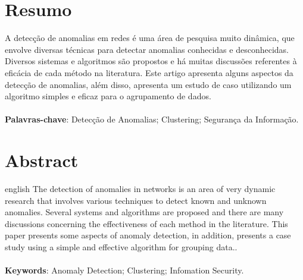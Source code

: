 \documentclass[article,12pt,oneside,a4paper,english,brazil]{unifil}
\date{}
\begin{document}
\frenchspacing
\maketitle
\normalsize

\fontsize{10}{1}\selectfont
\section*{Resumo}
A detecção de anomalias em redes é uma área de pesquisa muito dinâmica, que envolve diversas técnicas para detectar anomalias conhecidas e desconhecidas. Diversos sistemas e algoritmos são propostos e há muitas discussões referentes à eficácia de cada método na literatura. Este artigo apresenta alguns aspectos da detecção de anomalias, além disso, apresenta um estudo de caso utilizando um algoritmo simples e eficaz para o agrupamento de dados.\\
\vspace{\onelineskip} \\
\noindent
\textbf{Palavras-chave}: Detecção de Anomalias; Clustering; Segurança da Informação.



\section*{Abstract}
\begin{otherlanguage*}{english}
The detection of anomalies in networks is an area of very dynamic research that involves various techniques to detect known and unknown anomalies. Several systems and algorithms are proposed and there are many discussions concerning the effectiveness of each method in the literature. This paper presents some aspects of anomaly detection, in addition, presents a case study using a simple and effective algorithm for grouping data..\\
\vspace{\onelineskip}\\
\noindent
\textbf{Keywords}: Anomaly Detection; Clustering; Infomation Security.
\end{otherlanguage*}
\end{document}
